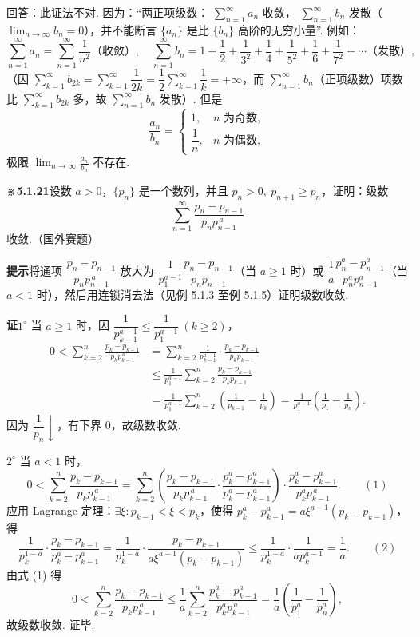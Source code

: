 \documentclass[UTF8, 12pt, fontset=fandol, oneside]{ctexart}
\begin{document}
回答：此证法不对. 因为：“两正项级数：
$\displaystyle\sum_{n=1}^{\infty}a_n$ 收敛，
$\displaystyle\sum_{n=1}^{\infty}b_n$ 发散（$\lim_{n\to\infty}b_n=0$），并不能断言
$\{a_n\}$ 是比 $\{b_n\}$ 高阶的无穷小量”. 例如：
\[
  \sum_{n=1}^{\infty}a_n=\sum_{n=1}^{\infty}\frac1{n^2}\text{（收敛）},\quad
  \sum_{n=1}^{\infty}b_n=1+\frac12+\frac1{3^2}+\frac14+\frac1{5^2}+\frac16+\frac1{7^2}+\cdots\text{（发散）},
\]
（因 $\displaystyle\sum_{k=1}^{\infty}b_{2k}
=\sum_{k=1}^{\infty}\dfrac1{2k}=\dfrac12\sum_{k=1}^{\infty}\dfrac1k=+\infty$，而
$\sum_{n=1}^{\infty}b_n$（正项级数）项数比 $\sum_{k=1}^{\infty}b_{2k}$ 多，故
$\sum_{n=1}^{\infty}b_n$ 发散）. 但是
\[
  \frac{a_n}{b_n}=
  \begin{cases}
  1, & n\text{ 为奇数},\\
  \dfrac1n, & n\text{ 为偶数},
  \end{cases}
\]
极限 $\displaystyle\lim_{n\to\infty}\frac{a_n}{b_n}$ 不存在.

\noindent\textbf{※5.1.21}\quad 设数 $a>0$，$\{p_n\}$ 是一个数列，并且
$p_n>0,\ p_{n+1}\ge p_n$，证明：级数
\[
  \sum_{n=1}^{\infty}\frac{p_n-p_{n-1}}{p_np_{n-1}^{\,a}}
\]
收敛.（国外赛题）

\noindent\textbf{提示}\quad 将通项 $\dfrac{p_n-p_{n-1}}{p_np_{n-1}^{\,a}}$ 放大为
$\dfrac1{p_1^{a-1}}\dfrac{p_n-p_{n-1}}{p_np_{n-1}}$（当 $a\ge1$ 时）或
$\dfrac1a\dfrac{p_n^a-p_{n-1}^a}{p_n^ap_{n-1}^a}$（当 $a<1$ 时），然后用连锁消去法（见例 5.1.3 至例 5.1.5）证明级数收敛.

\noindent\textbf{证}\quad $1^\circ$ 当 $a\ge1$ 时，因
$\dfrac1{p_{k-1}^{a-1}}\le\dfrac1{p_1^{a-1}}\ (k\ge2)$，
\[
\begin{aligned}
0<\sum_{k=2}^n\frac{p_k-p_{k-1}}{p_kp_{k-1}^{\,a}}
&=\sum_{k=2}^n\frac1{p_{k-1}^{a-1}}\cdot\frac{p_k-p_{k-1}}{p_kp_{k-1}}\\
&\le \frac1{p_1^{a-1}}\sum_{k=2}^n\frac{p_k-p_{k-1}}{p_kp_{k-1}}\\
&=\frac1{p_1^{a-1}}\sum_{k=2}^n\left(\frac1{p_{k-1}}-\frac1{p_k}\right)
=\frac1{p_1^{a-1}}\left(\frac1{p_1}-\frac1{p_n}\right).
\end{aligned}
\]
因为 $\dfrac1{p_n}\downarrow$，有下界 $0$，故级数收敛.

$2^\circ$ 当 $a<1$ 时，
\[
  0<\sum_{k=2}^n\frac{p_k-p_{k-1}}{p_kp_{k-1}^{\,a}}
  =\sum_{k=2}^n\left(\frac{p_k-p_{k-1}}{p_kp_{k-1}^{\,a}}\cdot
  \frac{p_k^a-p_{k-1}^a}{p_k^a-p_{k-1}^a}\right)
  \cdot\frac{p_k^a-p_{k-1}^a}{p_k^ap_{k-1}^{\,a}}.
\qquad(1)
\]
应用 Lagrange 定理：$\exists\xi:p_{k-1}<\xi<p_k$，使得
$p_k^a-p_{k-1}^a=a\xi^{a-1}(p_k-p_{k-1})$，得
\[
  \frac1{p_k^{1-a}}\cdot\frac{p_k-p_{k-1}}{p_k^a-p_{k-1}^a}
  =\frac1{p_k^{1-a}}\cdot
  \frac{p_k-p_{k-1}}{a\xi^{a-1}(p_k-p_{k-1})}
  \le\frac1{p_k^{1-a}}\cdot\frac1{ap_k^{a-1}}=\frac1a.
\qquad(2)
\]
由式 (1) 得
\[
  0<\sum_{k=2}^n\frac{p_k-p_{k-1}}{p_kp_{k-1}^{\,a}}
  \le\frac1a\sum_{k=2}^n\frac{p_k^a-p_{k-1}^a}{p_k^ap_{k-1}^{\,a}}
  =\frac1a\left(\frac1{p_1^a}-\frac1{p_n^a}\right),
\]
故级数收敛. 证毕.
\end{document}
